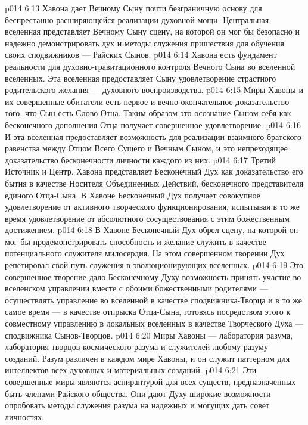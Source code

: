 \vs p014 6:13 Хавона дает Вечному Сыну почти безграничную основу для беспрестанно расширяющейся реализации духовной мощи. Центральная вселенная представляет Вечному Сыну сцену, на которой он мог бы безопасно и надежно демонстрировать дух и методы служения пришествия для обучения своих сподвижников --- Райских Сынов.
\vs p014 6:14 Хавона есть фундамент реальности для духовно\hyp{}гравитационного контроля Вечного Сына во вселенной вселенных. Эта вселенная предоставляет Сыну удовлетворение страстного родительского желания --- духовного воспроизводства.
\vs p014 6:15 Миры Хавоны и их совершенные обитатели есть первое и вечно окончательное доказательство того, что Сын есть Слово Отца. Таким образом это осознание Сыном себя как бесконечного дополнения Отца получает совершенное удовлетворение.
\vs p014 6:16 И эта вселенная предоставляет возможность для реализации взаимного братского равенства между Отцом Всего Сущего и Вечным Сыном, и это непреходящее доказательство бесконечности личности каждого из них.
\vs p014 6:17 \pc {}\bibnobreakspace {} Третий Источник и Центр. Хавона представляет Бесконечный Дух как доказательство его бытия в качестве Носителя Объединенных Действий, бесконечного представителя единого Отца\hyp{}Сына. В Хавоне Бесконечный Дух получает совокупное удовлетворение от активного творческого функционирования, испытывая в то же время удовлетворение от абсолютного сосуществования с этим божественным достижением.
\vs p014 6:18 В Хавоне Бесконечный Дух обрел сцену, на которой он мог бы продемонстрировать способность и желание служить в качестве потенциального служителя милосердия. На этом совершенном творении Дух репетировал свой путь служения в эволюционирующих вселенных.
\vs p014 6:19 Это совершенное творение дало Бесконечному Духу возможность принять участие во вселенском управлении вместе с обоими божественными родителями --- осуществлять управление во вселенной в качестве сподвижника\hyp{}Творца и в то же самое время --- в качестве отпрыска Отца\hyp{}Сына, готовясь посредством этого к совместному управлению в локальных вселенных в качестве Творческого Духа --- сподвижника Сынов\hyp{}Творцов.
\vs p014 6:20 Миры Хавоны --- лаборатория разума, лаборатория творцов космического разума и служителей любому разуму созданий. Разум различен в каждом мире Хавоны, и он служит паттерном для интеллектов всех духовных и материальных созданий.
\vs p014 6:21 Эти совершенные миры являются аспирантурой для всех существ, предназначенных быть членами Райского общества. Они дают Духу широкие возможности опробовать методы служения разума на надежных и могущих дать совет личностях.
